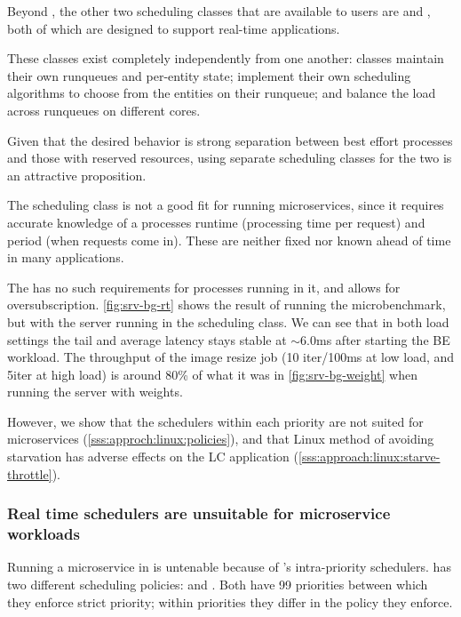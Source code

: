 Beyond \normalclass{}, the other two scheduling classes that are available to
users are \deadlineclass{} and \rtclass{}, both of which are designed to support
real-time applications.

These classes exist completely independently from one another: classes maintain
their own runqueues and per-entity state; implement their own scheduling
algorithms to choose from the entities on their runqueue; and balance the load
across runqueues on different cores.

Given that the desired behavior is strong separation between best effort
processes and those with reserved resources, using separate scheduling classes
for the two is an attractive proposition. 

The \deadlineclass{} scheduling class is not a good fit for running
microservices, since it requires accurate knowledge of a processes runtime
(processing time per request) and period (when requests come in). These are
neither fixed nor known ahead of time in many applications. 

The \rtclass{} has no such requirements for processes running in it, and allows
for oversubscription. \autoref{fig:srv-bg-rt} shows the result of running the
microbenchmark, but with the server running in the \rtclass{} scheduling class.
We can see that in both load settings the tail and average latency stays stable
at $\sim$6.0ms after starting the BE workload. The throughput of the image
resize job (10 iter/100ms at low load, and 5iter at high load) is around 80\% of
what it was in \autoref{fig:srv-bg-weight} when running the server with
\cgroups{} weights.


However, we show that the schedulers within each priority are not suited for
microservices (\autoref{sss:approch:linux:policies}), and that Linux method of
avoiding starvation has adverse effects on the LC application
(\autoref{sss:approach:linux:starve-throttle}).

\subsubsection{Real time schedulers are unsuitable for microservice
workloads}\label{sss:approch:linux:policies}

Running a microservice in \rtclass{} is untenable because of \rtclass{}'s
intra-priority schedulers. \rtclass{} has two different scheduling policies:
\schedfifo{} and \schedrr{}. Both have 99 priorities between which they enforce
strict priority; within priorities they differ in the policy they enforce.

